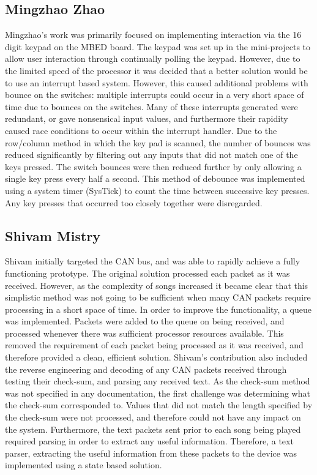 \subsection*{Mingzhao Zhao}
Mingzhao's work was primarily focused on implementing interaction via 
the 16 digit keypad on the MBED board. The keypad was set up in the mini-projects 
to allow user interaction through continually polling the keypad. However, due 
to the limited speed of the processor it was decided that a better solution 
would be to use an interrupt based system.
However, this caused additional problems with bounce on the switches: 
multiple interrupts could occur in a very short space of time due to bounces on 
the switches. Many of these interrupts generated were redundant, or gave 
nonsensical input values, and furthermore their rapidity caused race conditions 
to occur within the interrupt handler. 
Due to the row/column method in which the key pad is scanned, the 
number of bounces was reduced significantly by filtering out any inputs that 
did not match one of the keys pressed. The switch bounces were then reduced 
further by only allowing a single key press every half a second. 
This method of debounce was implemented using a system 
timer (SysTick) to count the time between successive key presses. Any key 
presses that occurred too closely together were disregarded. 

\subsection*{Shivam Mistry}
Shivam initially targeted the CAN bus, and was able to rapidly achieve a fully 
functioning prototype. The original solution processed each packet as it was 
received. However, as the complexity of songs increased it became clear that this 
simplistic method was not going to be sufficient when many CAN packets require 
processing in a short space of time.
In order to improve the functionality, a queue was implemented. Packets were 
added to the queue on being received, and processed whenever there was sufficient
processor resources available.
This removed the requirement of each packet being processed as it was received,
 and therefore provided a clean, efficient solution.
Shivam's contribution also included the reverse engineering and decoding of any
 CAN packets received through testing their check-sum, and parsing any received 
text.
As the check-sum method was not specified in any documentation, the first 
challenge was determining what the check-sum corresponded to. Values that did 
not match the length specified by the check-sum were not processed, and therefore 
could not have any impact on the system. Furthermore, the text packets sent prior 
to each song being played required parsing in order to extract any useful 
information. Therefore, a text parser, extracting the useful information from 
these packets to the device was implemented using a state based solution. 

